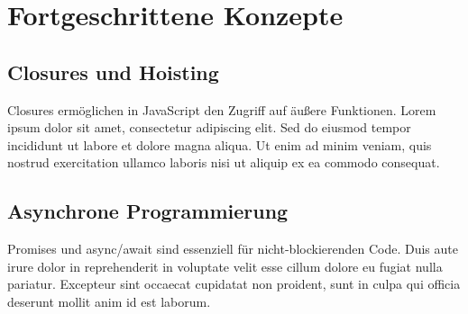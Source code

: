 \section{Fortgeschrittene Konzepte}
\label{sec:fortgeschritten}

\subsection{Closures und Hoisting}
Closures ermöglichen in JavaScript den Zugriff auf äußere Funktionen. Lorem ipsum dolor sit amet, consectetur adipiscing elit. Sed do eiusmod tempor incididunt ut labore et dolore magna aliqua. Ut enim ad minim veniam, quis nostrud exercitation ullamco laboris nisi ut aliquip ex ea commodo consequat.

\subsection{Asynchrone Programmierung}
Promises und async/await sind essenziell für nicht-blockierenden Code. Duis aute irure dolor in reprehenderit in voluptate velit esse cillum dolore eu fugiat nulla pariatur. Excepteur sint occaecat cupidatat non proident, sunt in culpa qui officia deserunt mollit anim id est laborum.
